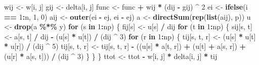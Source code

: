 \documentclass[
  12pt,
]{article}
\newenvironment{Shaded}{\begin{snugshade}}{\end{snugshade}}
\newcommand{\ControlFlowTok}[1]{\textcolor[rgb]{0.13,0.29,0.53}{\textbf{#1}}}
\newcommand{\DecValTok}[1]{\textcolor[rgb]{0.00,0.00,0.81}{#1}}
\newcommand{\FunctionTok}[1]{\textcolor[rgb]{0.13,0.29,0.53}{\textbf{#1}}}
\newcommand{\NormalTok}[1]{#1}
\newcommand{\OtherTok}[1]{\textcolor[rgb]{0.56,0.35,0.01}{#1}}
\newcommand{\SpecialCharTok}[1]{\textcolor[rgb]{0.81,0.36,0.00}{\textbf{#1}}}
\begin{document}
\begin{Shaded}
\begin{Highlighting}[]
\NormalTok{      wij }\OtherTok{\textless{}{-}}\NormalTok{ w[i, j]}
\NormalTok{      gij }\OtherTok{\textless{}{-}}\NormalTok{ delta[i, j]}
\NormalTok{      func }\OtherTok{\textless{}{-}}\NormalTok{ func }\SpecialCharTok{+}\NormalTok{ wij }\SpecialCharTok{*}\NormalTok{ (dij }\SpecialCharTok{{-}}\NormalTok{ gij) }\SpecialCharTok{\^{}} \DecValTok{2}
\NormalTok{      ei }\OtherTok{\textless{}{-}} \FunctionTok{ifelse}\NormalTok{(i }\SpecialCharTok{==} \DecValTok{1}\SpecialCharTok{:}\NormalTok{n, }\DecValTok{1}\NormalTok{, }\DecValTok{0}\NormalTok{)}
\NormalTok{      aij }\OtherTok{\textless{}{-}} \FunctionTok{outer}\NormalTok{(ei }\SpecialCharTok{{-}}\NormalTok{ ej, ei }\SpecialCharTok{{-}}\NormalTok{ ej)}
\NormalTok{      a }\OtherTok{\textless{}{-}} \FunctionTok{directSum}\NormalTok{(}\FunctionTok{rep}\NormalTok{(}\FunctionTok{list}\NormalTok{(aij), p))}
\NormalTok{      u }\OtherTok{\textless{}{-}} \FunctionTok{drop}\NormalTok{(a }\SpecialCharTok{\%*\%}\NormalTok{ y)}
      \ControlFlowTok{for}\NormalTok{ (s }\ControlFlowTok{in} \DecValTok{1}\SpecialCharTok{:}\NormalTok{np) \{}
\NormalTok{        fij[s] }\OtherTok{\textless{}{-}}\NormalTok{ u[s] }\SpecialCharTok{/}\NormalTok{ dij}
        \ControlFlowTok{for}\NormalTok{ (t }\ControlFlowTok{in} \DecValTok{1}\SpecialCharTok{:}\NormalTok{np) \{}
\NormalTok{          sij[s, t] }\OtherTok{\textless{}{-}}\NormalTok{ a[s, t] }\SpecialCharTok{/}\NormalTok{ dij }\SpecialCharTok{{-}}\NormalTok{ (u[s] }\SpecialCharTok{*}\NormalTok{ u[t]) }\SpecialCharTok{/}\NormalTok{ (dij }\SpecialCharTok{\^{}} \DecValTok{3}\NormalTok{)}
          \ControlFlowTok{for}\NormalTok{ (r }\ControlFlowTok{in} \DecValTok{1}\SpecialCharTok{:}\NormalTok{np) \{}
\NormalTok{            tij[s, t, r] }\OtherTok{\textless{}{-}}\NormalTok{ (u[s] }\SpecialCharTok{*}\NormalTok{ u[t] }\SpecialCharTok{*}\NormalTok{ u[r]) }\SpecialCharTok{/}\NormalTok{ (dij }\SpecialCharTok{\^{}} \DecValTok{5}\NormalTok{)}
\NormalTok{            tij[s, t, r] }\OtherTok{\textless{}{-}}
\NormalTok{              tij[s, t, r] }\SpecialCharTok{{-}}\NormalTok{ ((u[s] }\SpecialCharTok{*}\NormalTok{ a[t, r]) }\SpecialCharTok{+}\NormalTok{ (u[t] }\SpecialCharTok{+}\NormalTok{ a[s, r]) }\SpecialCharTok{+}\NormalTok{ (u[r] }\SpecialCharTok{*}\NormalTok{ a[s, t])) }\SpecialCharTok{/}\NormalTok{ (dij }\SpecialCharTok{\^{}} \DecValTok{3}\NormalTok{)}
\NormalTok{          \}}
\NormalTok{        \}}
\NormalTok{      \}}
\NormalTok{      ttot }\OtherTok{\textless{}{-}}\NormalTok{ ttot }\SpecialCharTok{{-}}\NormalTok{ w[i, j] }\SpecialCharTok{*}\NormalTok{ delta[i, j] }\SpecialCharTok{*}\NormalTok{ tij}

\end{Highlighting}
\end{Shaded}
\end{document}
